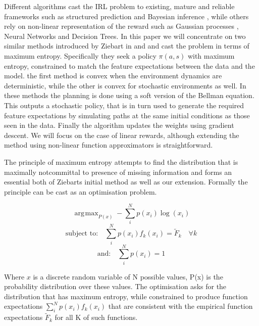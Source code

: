 \documentclass[letterpaper]{article}
\DeclareMathOperator*{\argmax}{\arg\!\max}
\begin{document}
Different algorithms cast the IRL problem to existing, mature and reliable frameworks such as structured prediction \cite{ratliff2006maximum} and Bayesian inference \cite{ramachandran2007bayesian}, while others rely on non-linear representation of the reward such as Gaussian processes \cite{levine2011nonlinear}, Neural Networks and Decision Trees\cite{ratliff2007boosting}. In this paper we will concentrate on two similar methods introduced by Ziebart in \cite{ziebart2008maximum} and \cite{ziebart2010modelingthesis} and cast the problem in terms of maximum entropy. Specifically they seek a policy $\pi(a,s)$ with maximum entropy, constrained to match the feature expectations between the data and the model. the first method is convex when the environment dynamics are deterministic, while the other is convex for stochastic environments as well. In these methods the planning is done using a soft version of the Bellman equation\cite{sutton1998reinforcement}. This outputs a stochastic policy, that is in turn used to generate the required feature expectations by simulating paths at the same initial conditions as those seen in the data. Finally the algorithm updates the weights using gradient descent. We will focus on the case of linear rewards, although extending the method using non-linear function approximators is straightforward.

	The principle of maximum entropy attempts to find the distribution that is maximally notcommittal to presence of missing information \cite{jaynes1957information} and forms an essential both of Ziebarts
	initial method as well as our extension. Formally the principle can be cast as an optimisation problem.

	\begin{equation}
	\argmax_{P(x)} -\sum_i^N p(x_i)\log(x_i)
	\end{equation}
	\begin{equation}
	\text{subject to:} \quad \sum_i^N p(x_i)f_k(x_i) = \widetilde{F}_k \quad \forall k \label{eqn:constraint1}
	\end{equation}
	\begin{equation}
	\text{and:} \quad \sum_i^N p(x_i) = 1 \label{eqn:constraint2}
	\end{equation}

	Where $x$ is a discrete random variable of N possible values, P(x) is the probability distribution over these values. The optimisation asks for the distribution that has maximum entropy, while constrained to produce function expectations $\sum_i^N p(x_i)f_k(x_i)$ that are consistent with the empirical function expectations $\widetilde{F}_k$ for all K of such functions.\\
\end{document}
